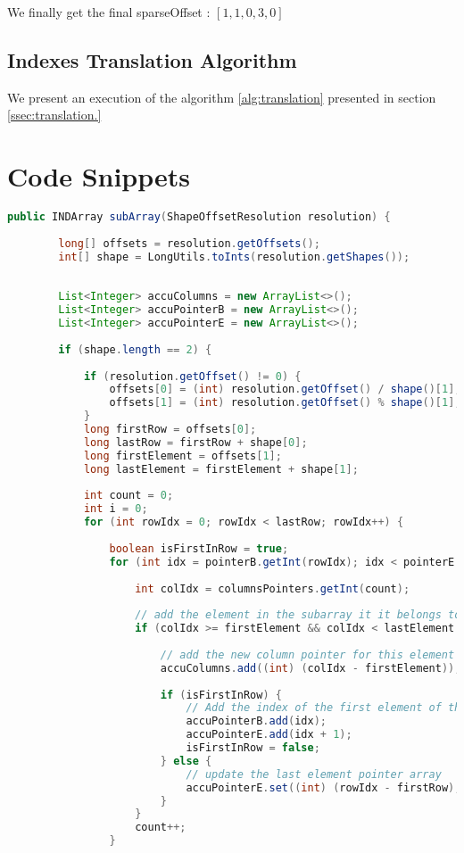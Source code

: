 	We finally get the final sparseOffset : $[1, 1, 0, 3, 0]$
	
	
\subsection{Indexes Translation Algorithm}
\label{ssec:idxtrans}
	
	We present an execution of the algorithm \ref{alg:translation} presented in section \ref{ssec:translation.}

\section{Code Snippets}

\label{ch:codesnip}

\begin{lstlisting}[caption=Extract a sub-array of a CSR matrix\label{lst:getcsc},language=Java]
	public INDArray subArray(ShapeOffsetResolution resolution) {
		
		long[] offsets = resolution.getOffsets();
		int[] shape = LongUtils.toInts(resolution.getShapes());
		
		
		List<Integer> accuColumns = new ArrayList<>();
		List<Integer> accuPointerB = new ArrayList<>();
		List<Integer> accuPointerE = new ArrayList<>();
		
		if (shape.length == 2) {
		
			if (resolution.getOffset() != 0) {
				offsets[0] = (int) resolution.getOffset() / shape()[1];
				offsets[1] = (int) resolution.getOffset() % shape()[1];
			}
			long firstRow = offsets[0];
			long lastRow = firstRow + shape[0];
			long firstElement = offsets[1];
			long lastElement = firstElement + shape[1];
			
			int count = 0;
			int i = 0;
			for (int rowIdx = 0; rowIdx < lastRow; rowIdx++) {	
				
				boolean isFirstInRow = true;
				for (int idx = pointerB.getInt(rowIdx); idx < pointerE.getInt(rowIdx); idx++) {
				
					int colIdx = columnsPointers.getInt(count);
					
					// add the element in the subarray it it belongs to the view
					if (colIdx >= firstElement && colIdx < lastElement && rowIdx >= firstRow && rowIdx < lastRow) {
						
						// add the new column pointer for this element
						accuColumns.add((int) (colIdx - firstElement));
						
						if (isFirstInRow) {
							// Add the index of the first element of the row in the pointer array
							accuPointerB.add(idx);
							accuPointerE.add(idx + 1);
							isFirstInRow = false;
						} else {
							// update the last element pointer array
							accuPointerE.set((int) (rowIdx - firstRow), idx + 1);
						}
					}			
					count++;
				}
				

\end{lstlisting}
